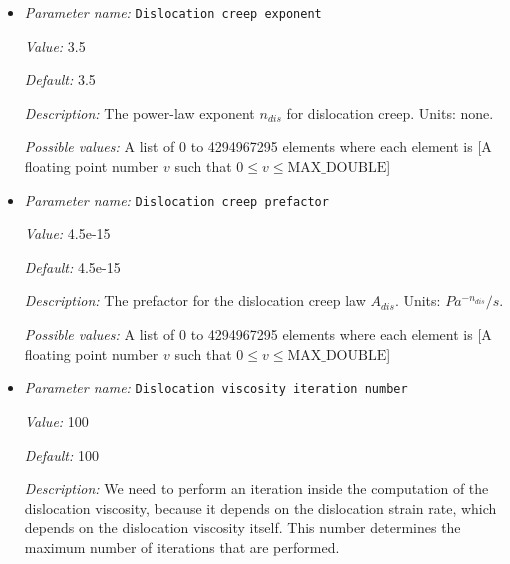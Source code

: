 \begin{itemize}
{\it Possible values:} A list of 0 to 4294967295 elements where each element is [A floating point number $v$ such that $0 \leq v \leq \text{MAX\_DOUBLE}$]
\item {\it Parameter name:} {\tt Dislocation creep exponent}
\label{parameters:Material model/Grain size model/Dislocation creep exponent}
\label{parameters:Material_20model/Grain_20size_20model/Dislocation_20creep_20exponent}


{\it Value:} 3.5


{\it Default:} 3.5


{\it Description:} The power-law exponent $n_{dis}$ for dislocation creep. Units: none.


{\it Possible values:} A list of 0 to 4294967295 elements where each element is [A floating point number $v$ such that $0 \leq v \leq \text{MAX\_DOUBLE}$]
\item {\it Parameter name:} {\tt Dislocation creep prefactor}
\label{parameters:Material model/Grain size model/Dislocation creep prefactor}
\label{parameters:Material_20model/Grain_20size_20model/Dislocation_20creep_20prefactor}


{\it Value:} 4.5e-15


{\it Default:} 4.5e-15


{\it Description:} The prefactor for the dislocation creep law $A_{dis}$. Units: $Pa^{-n_{dis}}/s$.


{\it Possible values:} A list of 0 to 4294967295 elements where each element is [A floating point number $v$ such that $0 \leq v \leq \text{MAX\_DOUBLE}$]
\item {\it Parameter name:} {\tt Dislocation viscosity iteration number}
\label{parameters:Material model/Grain size model/Dislocation viscosity iteration number}
\label{parameters:Material_20model/Grain_20size_20model/Dislocation_20viscosity_20iteration_20number}


{\it Value:} 100


{\it Default:} 100


{\it Description:} We need to perform an iteration inside the computation of the dislocation viscosity, because it depends on the dislocation strain rate, which depends on the dislocation viscosity itself. This number determines the maximum number of iterations that are performed. 



\end{itemize}
